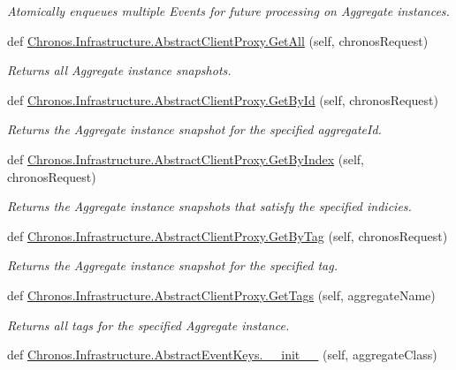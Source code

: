 \begin{DoxyCompactItemize}
\begin{DoxyCompactList}\small\item\em Atomically enqueues multiple Events for future processing on Aggregate instances. \end{DoxyCompactList}\item 
def \hyperlink{group__Chronos_ga3df0cb678abe0f8ffbcbf691ad8c1b31}{Chronos.\+Infrastructure.\+Abstract\+Client\+Proxy.\+Get\+All} (self, chronos\+Request)
\begin{DoxyCompactList}\small\item\em Returns all Aggregate instance snapshots. \end{DoxyCompactList}\item 
def \hyperlink{group__Chronos_ga086cc33a41671e67f00f4424397753ed}{Chronos.\+Infrastructure.\+Abstract\+Client\+Proxy.\+Get\+By\+Id} (self, chronos\+Request)
\begin{DoxyCompactList}\small\item\em Returns the Aggregate instance snapshot for the specified aggregate\+Id. \end{DoxyCompactList}\item 
def \hyperlink{group__Chronos_ga27d06ec274dfeed3590002c4dcb74c55}{Chronos.\+Infrastructure.\+Abstract\+Client\+Proxy.\+Get\+By\+Index} (self, chronos\+Request)
\begin{DoxyCompactList}\small\item\em Returns the Aggregate instance snapshots that satisfy the specified indicies. \end{DoxyCompactList}\item 
def \hyperlink{group__Chronos_ga540c48883317067ab1f56212487ba1a2}{Chronos.\+Infrastructure.\+Abstract\+Client\+Proxy.\+Get\+By\+Tag} (self, chronos\+Request)
\begin{DoxyCompactList}\small\item\em Returns the Aggregate instance snapshot for the specified tag. \end{DoxyCompactList}\item 
def \hyperlink{group__Chronos_gab81f0f1ed3d38772056236c66a99cb25}{Chronos.\+Infrastructure.\+Abstract\+Client\+Proxy.\+Get\+Tags} (self, aggregate\+Name)
\begin{DoxyCompactList}\small\item\em Returns all tags for the specified Aggregate instance. \end{DoxyCompactList}\item 
def \hyperlink{group__Chronos_ga019962482c2abdb3ca590c5bb62a1d2c}{Chronos.\+Infrastructure.\+Abstract\+Event\+Keys.\+\_\+\+\_\+init\+\_\+\+\_\+} (self, aggregate\+Class)

\end{DoxyCompactItemize}
